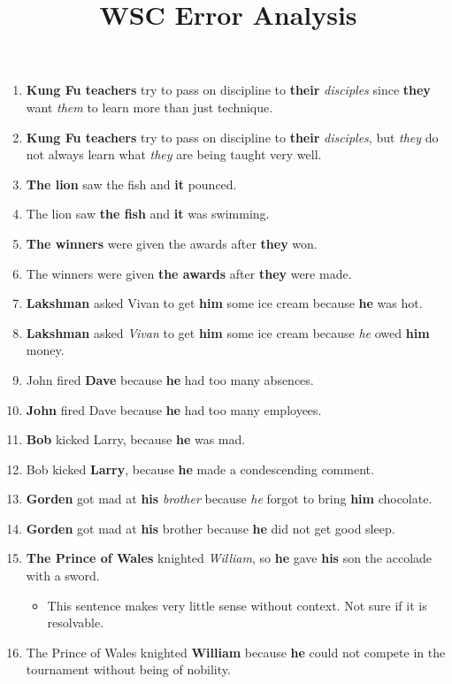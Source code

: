 \documentclass{article}
\begin{document}
\title{WSC Error Analysis}
\maketitle

\begin{enumerate}
	\item {\bf Kung Fu teachers} try to pass on discipline to {\bf their} {\it disciples} since {\bf they} want {\it them} to learn more than just technique.
	\item {\bf Kung Fu teachers} try to pass on discipline to {\bf their} {\it disciples}, but {\it they} do not always learn what {\it they} are being taught very well.
	\item {\bf The lion} saw the fish and {\bf it} pounced.
	\item The lion saw {\bf the fish} and {\bf it} was swimming.
	\item {\bf The winners} were given the awards after {\bf they} won.
	\item The winners were given {\bf the awards} after {\bf they} were made.
	\item {\bf Lakshman} asked Vivan to get {\bf him} some ice cream because {\bf he} was hot.
	\item {\bf Lakshman} asked {\it Vivan} to get {\bf him} some ice cream because {\it he} owed {\bf him} money.
	\item John fired {\bf Dave} because {\bf he} had too many absences.
	\item {\bf John} fired Dave because {\bf he} had too many employees.
	\item {\bf Bob} kicked Larry, because {\bf he} was mad.
	\item Bob kicked {\bf Larry}, because {\bf he} made a condescending comment.
	\item {\bf Gorden} got mad at {\bf his} {\it brother} because {\it he} forgot to bring {\bf him} chocolate.
	\item {\bf Gorden} got mad at {\bf his} brother because {\bf he} did not get good sleep.
	\item {\bf The Prince of Wales} knighted {\it William}, so {\bf he} gave {\bf his} son the accolade with a sword.
		\begin{itemize}
			\item This sentence makes very little sense without context. Not sure if it is resolvable.
		\end{itemize}
	\item The Prince of Wales knighted {\bf William} because {\bf he} could not compete in the tournament without being of nobility.

\end{enumerate}
\end{document}
